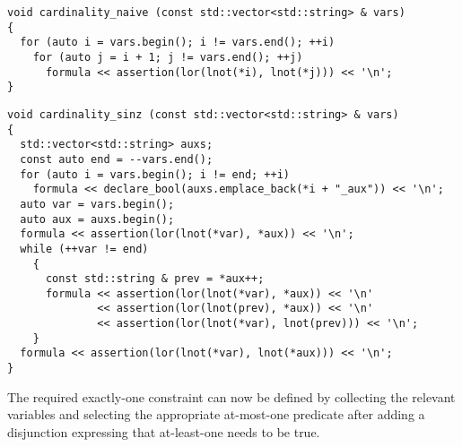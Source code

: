 \begin{lstlisting}[style=c++]
void cardinality_naive (const std::vector<std::string> & vars)
{
  for (auto i = vars.begin(); i != vars.end(); ++i)
    for (auto j = i + 1; j != vars.end(); ++j)
      formula << assertion(lor(lnot(*i), lnot(*j))) << '\n';
}
\end{lstlisting}


\begin{lstlisting}[style=c++]
void cardinality_sinz (const std::vector<std::string> & vars)
{
  std::vector<std::string> auxs;
  const auto end = --vars.end();
  for (auto i = vars.begin(); i != end; ++i)
    formula << declare_bool(auxs.emplace_back(*i + "_aux")) << '\n';
  auto var = vars.begin();
  auto aux = auxs.begin();
  formula << assertion(lor(lnot(*var), *aux)) << '\n';
  while (++var != end)
    {
      const std::string & prev = *aux++;
      formula << assertion(lor(lnot(*var), *aux)) << '\n'
              << assertion(lor(lnot(prev), *aux)) << '\n'
              << assertion(lor(lnot(*var), lnot(prev))) << '\n';
    }
  formula << assertion(lor(lnot(*var), lnot(*aux))) << '\n';
}
\end{lstlisting}

%
%
%


\noindent
The required exactly-one constraint can now be defined by collecting the relevant variables and selecting the appropriate at-most-one predicate after adding a disjunction expressing that at-least-one needs to be true.

